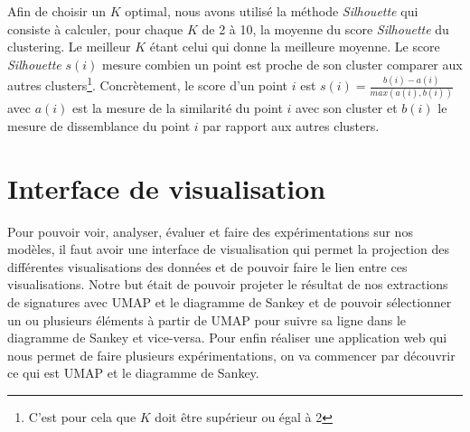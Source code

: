 \documentclass[oneside,13pt,a4paper]{report}
\begin{document}
Afin de choisir un $K$ optimal, nous avons utilisé la méthode \textit{Silhouette} qui consiste à calculer, pour chaque $K$ de 2 à 10, la moyenne du score \textit{Silhouette} du clustering. Le meilleur $K$ étant celui qui donne la meilleure moyenne. Le score \textit{Silhouette} $ s(i) $ mesure combien un point est proche de son cluster comparer aux autres clusters\footnote{C'est pour cela que $ K $ doit être supérieur ou égal à 2}. Concrètement, le score d'un point $i$ est $ s(i) = \frac{b(i) - a(i)}{max(a(i), b(i))} $ avec $a(i)$ est la mesure de la similarité du point $i$ avec son cluster et $b(i)$ le mesure de dissemblance du point $i$ par rapport aux autres clusters.

\section{Interface de visualisation}
Pour pouvoir voir, analyser, évaluer et faire des expérimentations sur nos modèles, il faut avoir une interface de visualisation qui permet la projection des différentes visualisations des données et de pouvoir faire le lien entre ces visualisations.
Notre but était de pouvoir projeter le résultat de nos extractions de signatures avec UMAP et le diagramme de Sankey et de pouvoir sélectionner un ou plusieurs éléments à partir de UMAP pour suivre sa ligne dans le diagramme de Sankey et vice-versa.
Pour enfin réaliser une application web qui nous permet de faire plusieurs expérimentations, on va commencer par découvrir ce qui est UMAP et le diagramme de Sankey.
\end{document}
